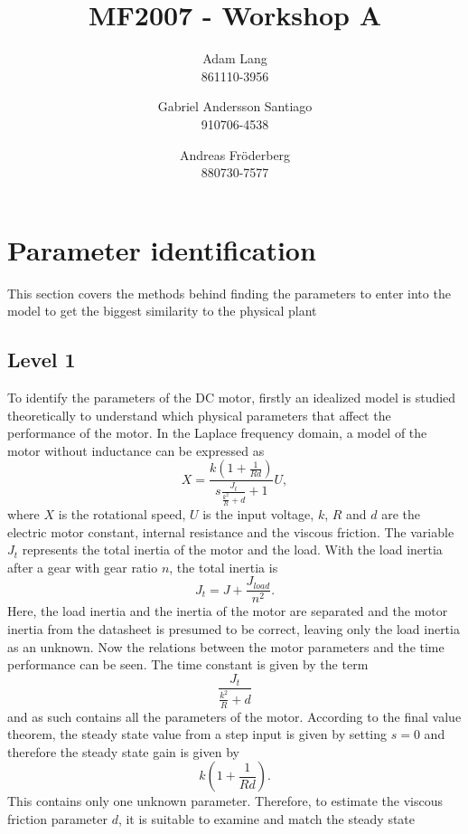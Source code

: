 \documentclass[12pt,a4paper]{article}
\title{MF2007 - Workshop A}
\author{
Adam Lang \\ 861110-3956
\and
Gabriel Andersson Santiago \\ 910706-4538
\and 
Andreas Fr\"oderberg \\ 880730-7577
}
\begin{document}
\maketitle
\section*{Parameter identification}
This section covers the methods behind finding the parameters to enter into the
model to get the biggest similarity to the physical plant
\subsection*{Level 1}
To identify the parameters of the DC motor, firstly an idealized model is
studied theoretically to understand which physical parameters that affect the
performance of the motor. In the Laplace frequency domain, a model of the motor
without inductance can be expressed as 
\begin{equation}
    \label{eq:motormodel}
    X = \frac {k (1 + \frac{1}{Rd})} {s \frac {J_t} { \frac {k^2} {R} + d} + 1}
    U,
\end{equation}
where $X$ is the rotational speed, $U$ is the input voltage, $k$, $R$ and $d$
are the electric motor constant, internal resistance and the viscous friction.
The variable $J_t$ represents the total inertia of the motor and the load. With
the load inertia after a gear with gear ratio $n$, the total inertia is
\begin{equation}
    \label{eq:inertia}
    J_t = J + \frac{J_{load}}{n^2}.
\end{equation}
Here, the load inertia and the inertia of the motor are separated and the motor
inertia from the datasheet is presumed to be correct, leaving only the load
inertia as an unknown.  Now the relations between the motor parameters and the
time performance can be seen. The time constant is given by the term
\begin{equation}
    \label{eq:timeconstant}
    \frac {J_t} { \frac {k^2} {R} + d}
\end{equation}
and as such contains all the parameters of the motor. According to the final
value theorem, the steady state value from a step input is given by setting
$s=0$ and therefore the steady state gain is given by 
\begin{equation}
    \label{eq:steadystate}
    k (1 + \frac{1}{Rd}).
\end{equation}
This contains only one unknown parameter. Therefore, to estimate the viscous
friction parameter $d$, it is suitable to examine and match the steady state
\end{document}
